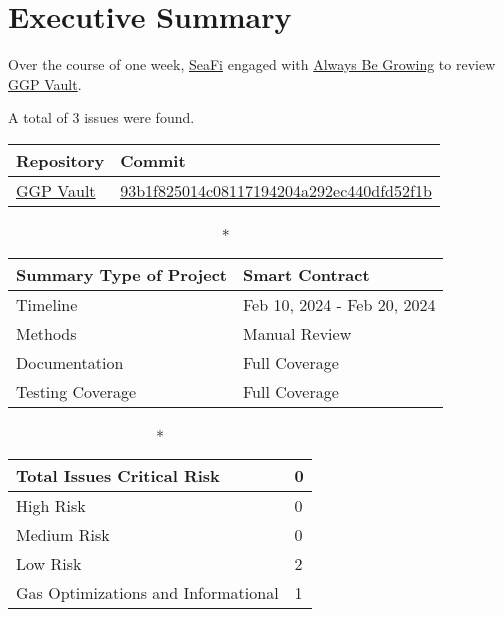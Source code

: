 \hypertarget{executive-summary}{%
\section{Executive Summary}\label{executive-summary}}

Over the course of one week, \href{https://seafi.app}{SeaFi} engaged with
\href{http://abg.garden}{Always Be Growing} to review
\href{https://github.com/SeaFi-Labs/GGP-Vault}{GGP Vault}. 

A total of 3 issues were found. 

\begin{longtable}[c]{|l|l|}
\hline \textbf{Repository} & \textbf{Commit} \\

\hline
\href{https://github.com/SeaFi-Labs/GGP-Vault}{GGP Vault} &
\href{https://github.com/SeaFi-Labs/GGP-Vault/commit/93b1f825014c08117194204a292ec440dfd52f1b}{93b1f825014c08117194204a292ec440dfd52f1b} \\
\hline
\end{longtable}

\begin{longtable}[]{|l|l|}

\caption*{\textbf{Summary}}
\hline Type of Project & Smart Contract \\   
\hline Timeline & Feb 10, 2024 - Feb 20, 2024   \\
\hline Methods & Manual Review \\
\hline Documentation & Full Coverage \\
\hline Testing Coverage & Full Coverage \\
\hline
\end{longtable}


\begin{longtable}[]{|l|l|}
\caption*{\textbf{Total Issues}}
\hline Critical Risk & 0 \\
\hline High Risk & 0 \\
\hline Medium Risk & 0 \\ 
\hline Low Risk & 2 \\
\hline Gas Optimizations and Informational & 1 \\
\hline
\end{longtable}

